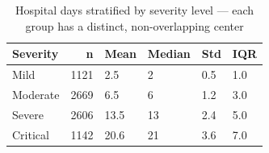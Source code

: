 \begin{table}[htbp]
\caption{Hospital days stratified by severity level — each group has a distinct, non-overlapping center}
\label{tab:hospital_severity}
\begin{tabular}{lrllll}
\toprule
Severity & n & Mean & Median & Std & IQR \\
\midrule
Mild & 1121 & 2.5 & 2 & 0.5 & 1.0 \\
Moderate & 2669 & 6.5 & 6 & 1.2 & 3.0 \\
Severe & 2606 & 13.5 & 13 & 2.4 & 5.0 \\
Critical & 1142 & 20.6 & 21 & 3.6 & 7.0 \\
\bottomrule
\end{tabular}
\end{table}
